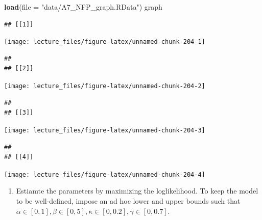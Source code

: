 \documentclass[]{book}
\newenvironment{Shaded}{\begin{snugshade}}{\end{snugshade}}
\newcommand{\KeywordTok}[1]{\textcolor[rgb]{0.13,0.29,0.53}{\textbf{#1}}}
\newcommand{\DataTypeTok}[1]{\textcolor[rgb]{0.13,0.29,0.53}{#1}}
\newcommand{\StringTok}[1]{\textcolor[rgb]{0.31,0.60,0.02}{#1}}
\newcommand{\NormalTok}[1]{#1}
\providecommand{\tightlist}{%
  \setlength{\itemsep}{0pt}\setlength{\parskip}{0pt}}
\begin{document}
\begin{Shaded}
\begin{Highlighting}[]
\KeywordTok{load}\NormalTok{(}\DataTypeTok{file =} \StringTok{"data/A7_NFP_graph.RData"}\NormalTok{)}
\NormalTok{graph}
\end{Highlighting}
\end{Shaded}

\begin{verbatim}
## [[1]]
\end{verbatim}

\begin{center}\texttt{[image: lecture\_files/figure-latex/unnamed-chunk-204-1]} \end{center}

\begin{verbatim}
## 
## [[2]]
\end{verbatim}

\begin{center}\texttt{[image: lecture\_files/figure-latex/unnamed-chunk-204-2]} \end{center}

\begin{verbatim}
## 
## [[3]]
\end{verbatim}

\begin{center}\texttt{[image: lecture\_files/figure-latex/unnamed-chunk-204-3]} \end{center}

\begin{verbatim}
## 
## [[4]]
\end{verbatim}

\begin{center}\texttt{[image: lecture\_files/figure-latex/unnamed-chunk-204-4]} \end{center}

\begin{enumerate}
\def\labelenumi{\arabic{enumi}.}
\setcounter{enumi}{3}
\tightlist
\item
  Estiamte the parameters by maximizing the loglikelihood. To keep the
  model to be well-defined, impose an ad hoc lower and upper bounds such
  that
  \(\alpha \in [0, 1], \beta \in [0, 5], \kappa \in [0, 0.2], \gamma \in [0, 0.7]\).
\end{enumerate}
\end{document}
